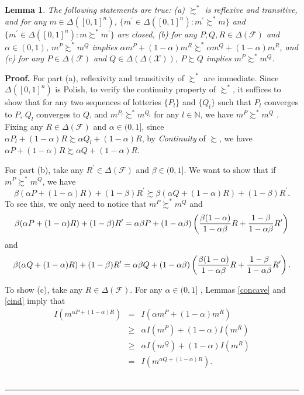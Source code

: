 \documentclass[12pt, notitlepage]{article}
\newtheorem{lemma}{Lemma}
\newenvironment{proof}[1][Proof]{\noindent\textbf{#1.} }{\ \rule{0.5em}{0.5em}}
\begin{document}
\begin{lemma}
\label{nci}The following statements are true: (a) $\succsim ^{\ast }$ is
reflexive and transitive, and for any $m\in \Delta ([0,1]^{n})$, $%
\{m^{\prime }\in \Delta ([0,1]^{n}):m^{\prime }\succsim ^{\ast }m\}$ and $%
\{m^{\prime }\in \Delta ([0,1]^{n}):m\succsim ^{\ast }m^{\prime }\}$ are
closed, (b) for any $P,Q,R\in \Delta (\mathcal{F})$ and $\alpha \in (0,1)$, $%
m^{P}\succsim ^{\ast }m^{Q}$ implies $\alpha m^{P}+(1-\alpha )m^{R}\succsim
^{\ast }\alpha m^{Q}+(1-\alpha )m^{R}$, and (c) for any $P\in \Delta (%
\mathcal{F})$ and $Q\in \Delta (\Delta (\mathcal{X}))$, $P\succsim Q$
implies $m^{P}\succsim ^{\ast }m^{Q}$.
\end{lemma}

\begin{proof}
For part (a), reflexivity and transitivity of $\succsim ^{\ast }$ are
immediate. Since $\Delta ([0,1]^{n})$ is Polish, to verify the continuity
property of $\succsim ^{\ast }$, it suffices to show that for any two
sequences of lotteries $\{P_{l}\}$ and $\{Q_{l}\}$ such that $P_{l}$
converges to $P$, $Q_{l}$ converges to $Q$, and $m^{P_{l}}\succsim ^{\ast
}m^{Q_{l}}$ for any $l\in \mathbb{N}$, we have $m^{P}\succsim ^{\ast }m^{Q}$%
. Fixing any $R\in \Delta (\mathcal{F})$ and $\alpha \in (0,1]$, since $%
\alpha P_{l}+(1-\alpha )R\succsim \alpha Q_{l}+(1-\alpha )R$, by \textit{%
Continuity} of $\succsim $, we have $\alpha P+(1-\alpha )R\succsim \alpha
Q+(1-\alpha )R$.

For part (b), take any $R^{\prime }\in \Delta (\mathcal{F})$ and $\beta \in
(0,1]$. We want to show that if $m^{P}\succsim ^{\ast }m^{Q}$, we have%
\begin{equation*}
\beta (\alpha P+(1-\alpha )R)+(1-\beta )R^{\prime }\succsim \beta (\alpha
Q+(1-\alpha )R)+(1-\beta )R^{\prime }.
\end{equation*}%
To see this, we only need to notice that $m^{P}\succsim ^{\ast }m^{Q}$ and%
\begin{equation*}
\beta (\alpha P+(1-\alpha )R)+(1-\beta )R^{\prime }=\alpha \beta P+(1-\alpha
\beta )\left( \frac{\beta (1-\alpha )}{1-\alpha \beta }R+\frac{1-\beta }{%
1-\alpha \beta }R^{\prime }\right)
\end{equation*}%
and%
\begin{equation*}
\beta (\alpha Q+(1-\alpha )R)+(1-\beta )R^{\prime }=\alpha \beta Q+(1-\alpha
\beta )\left( \frac{\beta (1-\alpha )}{1-\alpha \beta }R+\frac{1-\beta }{%
1-\alpha \beta }R^{\prime }\right) .
\end{equation*}

To show (c), take any $R\in \Delta (\mathcal{F})$. For any $\alpha \in (0,1]$%
, Lemmas \ref{concave} and \ref{cind} imply that%
\begin{eqnarray*}
I(m^{\alpha P+(1-\alpha )R}) &=&I(\alpha m^{P}+(1-\alpha )m^{R}) \\
&\geq &\alpha I(m^{P})+(1-\alpha )I(m^{R}) \\
&\geq &\alpha I(m^{Q})+(1-\alpha )I(m^{R}) \\
&=&I(m^{\alpha Q+(1-\alpha )R}).
\end{eqnarray*}
\end{proof}
\end{document}
